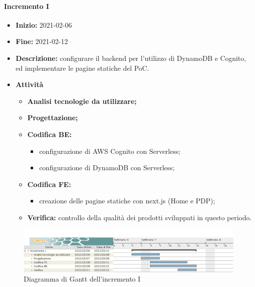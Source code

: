 \paragraph[Incremento I]{Incremento I}
\begin{itemize}
    \item [] \textbf{Inizio:} 2021-02-06
    \item [] \textbf{Fine:} 2021-02-12
    \item [] \textbf{Descrizione:} configurare il backend per l'utilizzo di DynamoDB e Cognito, ed implementare le pagine statiche del PoC.
    \item [] \textbf{Attività}
          \begin{itemize}
              \item \textbf{Analisi tecnologie da utilizzare;}
              \item \textbf{Progettazione;}
              \item \textbf{Codifica BE:}
                    \begin{itemize}
                        \item configurazione di AWS Cognito con Serverless;
                        \item configurazione di DynamoDB con Serverless;
                    \end{itemize}
              \item \textbf{Codifica FE:}
                    \begin{itemize}
                        \item creazione delle pagine statiche con next.js (Home e PDP);
                    \end{itemize}
              \item \textbf{Verifica:} controllo della qualità dei prodotti sviluppati in questo periodo.
          \end{itemize}

\end{itemize}

\begin{figure}[H]
    \centering
    \includegraphics[width=1\linewidth]{res/images/pianificazione/incremento_1.png}
    \caption{Diagramma di Gantt dell'incremento I}
    \label{fig:_Gantt incremento I}
\end{figure}

